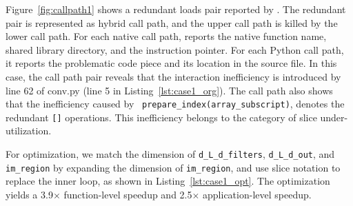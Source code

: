 Figure~\ref{fig:callpath1} shows a redundant loads pair reported by \tool. The redundant pair is represented as hybrid call path, and the upper call path is killed by the lower call path. For each native call path, \tool reports the native function name, shared library directory, and the instruction pointer. For each Python call path, it reports the problematic code piece and its location in the source file. In this case, the call path pair reveals that the interaction inefficiency is introduced by line 62 of conv.py (line 5 in Listing~\ref{lst:case1_org}). The call path also shows that the inefficiency caused by \ff \ {\tt prepare\_index({\tt array\_subscript})}, denotes the redundant {\tt []} operations. This inefficiency belongs to the category of slice under-utilization. 

For optimization, we match the dimension of {\tt d\_L\_d\_filters}, {\tt d\_L\_d\_out}, and {\tt im\_region} by expanding the dimension of {\tt im\_region}, and use slice notation to replace the inner loop, as shown in Listing~\ref{lst:case1_opt}. The optimization yields a 3.9$\times$ function-level speedup and 2.5$\times$ application-level speedup.











